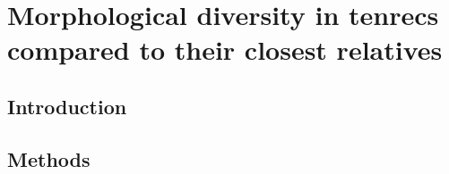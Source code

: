\chapter{Morphological diversity in tenrecs compared to their closest relatives}
\label{chap:disparity}

\section{Introduction}

\section{Methods}


	
	

